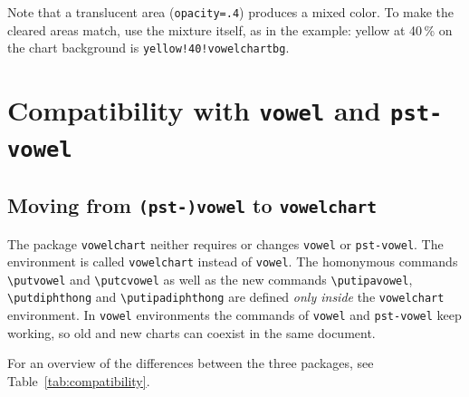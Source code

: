 \documentclass[a4paper,11pt]{article}
\newcommand\cmd[1]{\texttt{\textbackslash #1}}
\newcommand\pkg[1]{\texttt{#1}}
\begin{document}
\noindent
Note that a translucent area (\texttt{opacity=.4}) produces a mixed color. To make the cleared areas match, use the mixture itself, as in the example: yellow at 40\,\% on the chart background is \texttt{yellow!40!vowelchartbg}.




\section{Compatibility with \pkg{vowel} and \pkg{pst-vowel}}\label{sec:compat}

\subsection{Moving from \pkg{(pst-)vowel} to \pkg{vowelchart}}

The package \pkg{vowelchart} neither requires or changes \pkg{vowel} or \pkg{pst-vowel}.
The environment is called \texttt{vowelchart} instead of \texttt{vowel}. The homonymous commands \cmd{putvowel} and \cmd{putcvowel} as well as the new commands \cmd{putipavowel}, \cmd{putdiphthong} and \cmd{putipadiphthong} are defined \textit{only inside} the \texttt{vowelchart} environment. In \texttt{vowel} environments the commands of \pkg{vowel} and \pkg{pst-vowel} keep working, so old and new charts can coexist in the same document.

For an overview of the differences between the three packages, see Table~\ref{tab:compatibility}.
\end{document}
